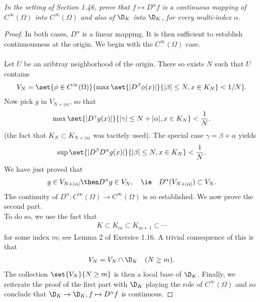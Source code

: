 \textit{In the setting of Section 1.46, prove that 
    $f \mapsto D^{\alpha}f$ 
is a continuous mapping of 
%
  $C^{\infty}(\Omega)$ into 
  $C^{\infty}(\Omega)$ and also of 
  $\D_{K}$ into 
  $\D_{K}$, for every multi-index $\alpha$.
%
}
\begin{proof} 
In both cases, $D^\alpha$ is a linear mapping. 
It is then sufficient to establish continuousness at the origin.
%
We begin with the $C^\infty(\Omega)$ case. \\
\\
Let $U$ be an aribtray neighborhood of the origin.
There so exists $N$ such that $U$ contains
%
  \begin{align} 
    V_{N}= \set{
      \phi \in C^\infty(\Omega)
    }{
      \max
      \set{
        | D^\beta\phi(x) |
      }{
        | \beta | \leq N, x\in K_N
      }
    < 1/N
    }.
  \end{align}
%
Now pick $g$ in $V_{N+|\alpha|}$, so that
%
  \begin{align}
    \max
    \set{
      | D^\gamma g(x) |
    }{
      | \gamma | \leq N+| \alpha |, 
      x\in K_{N}
    }
    < \frac{1}{N}.
  \end{align}
%
(the fact that $K_N\subset K_{N+|\alpha|}$ was tacitely used).
%
The special case $\gamma = \beta + \alpha$ yields
\begin{align}
    \sup
    \set{
      | D^\beta D^\alpha g(x) |
    }{
      | \beta | \leq N, 
      x\in K_{N}
    }
    < \frac{1}{N}.
  \end{align}
%
We have just proved that
%
  \begin{align}
    g \in V_{N + | \alpha|}
      \then 
    D^\alpha g \in V_{N},
      \quad
      \ie
      \quad
    D^\alpha (V_{N+|\alpha|}) \subset V_N.
  \end{align}
%
The continuity of 
  $D^{\alpha}: C^\infty (\Omega) \to C^\infty (\Omega)$ 
is so established.
%
We now prove the second part.
\\
%
To do so, we use the fact that 
%
  \begin{align}
    K \subset K_m \subset K_{m+1} \subset \cdots
  \end{align}
for some index $m$; see Lemma 2 of Exersice 1.16. 
A trivial consequence of this is that
  \begin{align}
    V_N = V_N \cap \D_K \quad (N \geq m).
  \end{align}
The collection $\set{V_N}{N \geq m}$ is then a local base of $\D_K$.
Finally, we reiterate the proof of the first part with $\D_K$ playing the role 
of $C^\infty(\Omega)$ and so conclude that $\D_K\to\D_K, f\mapsto D^\alpha f$ 
is continuous.
\end{proof}
